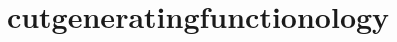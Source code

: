 \documentclass{article}
\date{}\author{}
\title{cutgeneratingfunctionology}
\begin{document}
\maketitle
\nocite{*}
\sloppy


\end{document}
